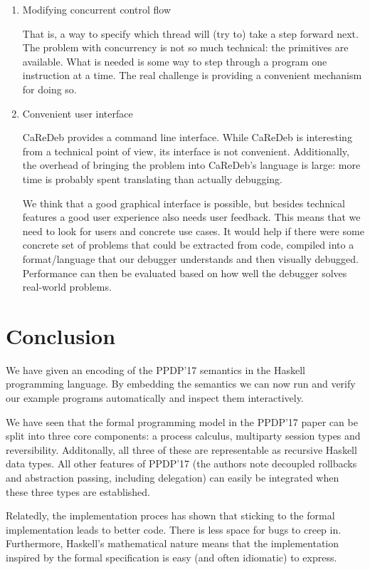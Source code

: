 \documentclass[runningheads,plain]{llncs}
\begin{document}
\begin{enumerate}
\def\labelenumi{\arabic{enumi}.}
\item
  Modifying concurrent control flow

  That is, a way to specify which thread will (try to) take a step
  forward next. The problem with concurrency is not so much technical:
  the primitives are available. What is needed is some way to step
  through a program one instruction at a time. The real challenge is
  providing a convenient mechanism for doing so.
\item
  Convenient user interface

  CaReDeb provides a command line interface. While CaReDeb is
  interesting from a technical point of view, its interface is not
  convenient. Additionally, the overhead of bringing the problem into
  CaReDeb's language is large: more time is probably spent translating
  than actually debugging.

  We think that a good graphical interface is possible, but besides
  technical features a good user experience also needs user feedback.
  This means that we need to look for users and concrete use cases. It
  would help if there were some concrete set of problems that could be
  extracted from code, compiled into a format/language that our debugger
  understands and then visually debugged. Performance can then be
  evaluated based on how well the debugger solves real-world problems.
\end{enumerate}

\section{Conclusion}\label{conclusion}

We have given an encoding of the PPDP'17 semantics in the Haskell
programming language. By embedding the semantics we can now run and
verify our example programs automatically and inspect them
interactively.

We have seen that the formal programming model in the PPDP'17 paper can
be split into three core components: a process calculus, multiparty
session types and reversibility. Additonally, all three of these are
representable as recursive Haskell data types. All other features of
PPDP'17 (the authors note decoupled rollbacks and abstraction passing,
including delegation) can easily be integrated when these three types
are established.

Relatedly, the implementation proces has shown that sticking to the
formal implementation leads to better code. There is less space for bugs
to creep in. Furthermore, Haskell's mathematical nature means that the
implementation inspired by the formal specification is easy (and often
idiomatic) to express.
\end{document}
